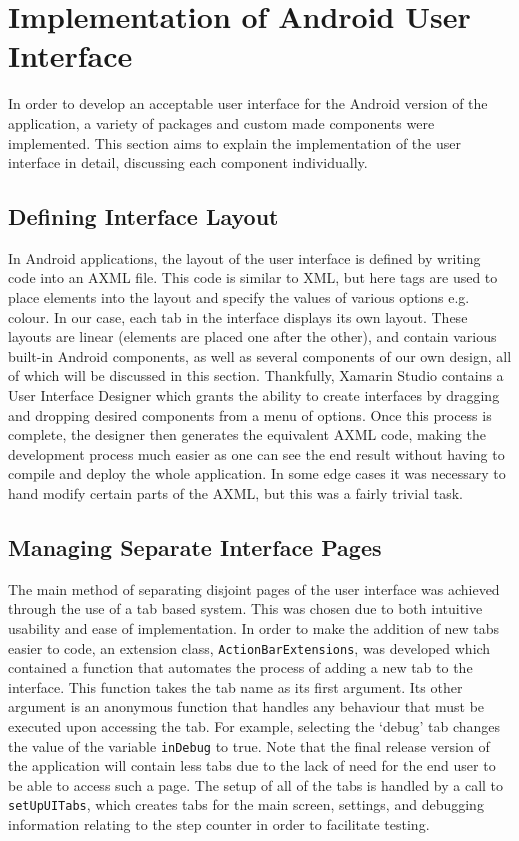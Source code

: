 \documentclass[main.tex]{subfiles}
\begin{document}
    \section*{Implementation of Android User Interface}
        In order to develop an acceptable user interface for the Android version of the application, a variety of packages and custom made
        components were implemented. This section aims to explain the implementation of the user interface in detail, discussing each component
        individually.
        \subsection*{Defining Interface Layout}
	        In Android applications, the layout of the user interface is defined by writing code into an AXML file. This code is similar to
            XML, but here tags are used to place elements into the layout and specify the values of various options e.g. colour.
            In our case, each tab in the interface displays its own layout.
            These layouts are linear (elements are placed one after the other), and contain various built-in Android components, as well
            as several components of our own design, all of which will be discussed in this section. Thankfully, Xamarin Studio contains a 
            User Interface Designer which grants the ability to create interfaces by dragging and dropping desired components from a menu
            of options. Once this process is complete, the designer then generates the equivalent AXML code, making the development process
            much easier as one can see the end result without having to compile and deploy the whole application. In some edge cases it was necessary
            to hand modify certain parts of the AXML, but this was a fairly trivial task.
        \subsection*{Managing Separate Interface Pages}
            The main method of separating disjoint pages of the user interface was achieved through the use of a tab based system. This was chosen due
            to both intuitive usability and ease of implementation. In order to make the addition of new tabs easier to code, an extension class,
            \texttt{ActionBarExtensions}, was developed which contained a function that automates the process of adding a new tab to the
            interface. This function takes the tab name as its first argument. Its other argument is an anonymous function that handles any behaviour
            that must be executed upon accessing the tab. For example, selecting the `debug' tab changes the value of the variable \texttt{inDebug} to
            true. Note that the final release version of the application will contain less tabs due to the lack of need for the end user to be able to access
            such a page. The setup of all of the tabs is handled by a call to \texttt{setUpUITabs}, which creates tabs for the main screen, settings, and 
            debugging information relating to the step counter in order to facilitate testing.
\end{document}
